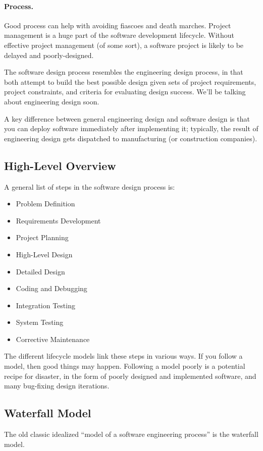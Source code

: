 \paragraph{Process.} Good process can help with avoiding fiascoes and
death marches. Project management is a huge part of the software
development lifecycle. Without effective project management (of some
sort), a software project is likely to be delayed and poorly-designed.

The software design process resembles the engineering design process,
in that both attempt to build the best possible design given sets of
project requirements, project constraints, and criteria for evaluating
design success. We'll be talking about engineering design soon.

A key difference between general engineering design and software design is that
you can deploy software immediately after implementing it; 
typically, the result of engineering design gets dispatched to manufacturing
(or construction companies).

\subsection*{High-Level Overview}
A general list of steps in the software design
process is:

\begin{itemize}
\item Problem Definition
\item Requirements Development
\item Project Planning
\item High-Level Design
\item Detailed Design
\item Coding and Debugging
\item Integration Testing
\item System Testing
\item Corrective Maintenance
\end{itemize}

The different lifecycle models link these steps in various ways. If you follow a model, then good things may happen. Following a model poorly is a potential recipe for disaster, in the form of poorly designed
and implemented software, and many bug-fixing design iterations.


\subsection*{Waterfall Model}
The old classic idealized ``model of a software engineering process''
is the waterfall model.

